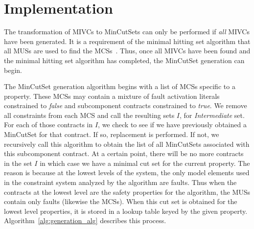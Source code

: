 \section{Implementation}
\label{sec:impl}









The transformation of MIVCs to MinCutSets can only be performed if \emph{all} MIVCs have been generated. It is a requirement of the minimal hitting set algorithm that all MUSs are used to find the MCSs~\cite{liffiton2016fast,gainer2017minimal,murakami2013efficient}. Thus, once all MIVCs have been found and the minimal hitting set algorithm has completed, the MinCutSet generation can begin. 

The MinCutSet generation algorithm begins with a list of MCSs specific to a property. These MCSs may contain a mixture of fault activation literals constrained to \textit{false} and subcomponent contracts constrained to \textit{true}. We remove all constraints from each MCS and call the resulting sets $I$, for \textit{Intermediate} set.  For each of those contracts in $I$, we check to see if we have previously obtained a MinCutSet for that contract. If so, replacement is performed. If not, we recursively call this algorithm to obtain the list of all MinCutSets associated with this subcomponent contract. At a certain point, there will be no more contracts in the set $I$ in which case we have a minimal cut set for the current property. The reason is because at the lowest levels of the system, the only model elements used in the constraint system analyzed by the \aivcalg algorithm are faults. Thus when the contracts at the lowest level are the safety properties for the \aivcalg algorithm, the MUSs contain only faults (likewise the MCSs). When this cut set is obtained for the lowest level properties, it is stored in a lookup table keyed by the given property. Algorithm~\ref{alg:generation_alg} describes this process.


